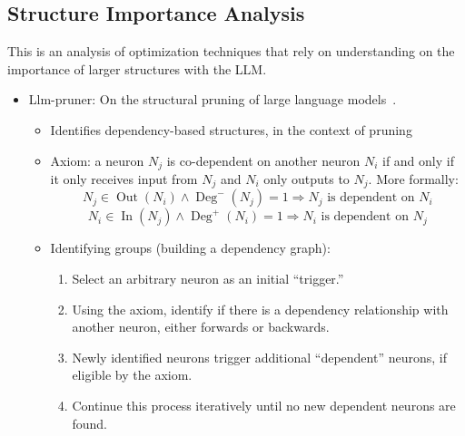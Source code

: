 
\subsection{Structure Importance Analysis}\label{subsec:strucure-importance-analysis}

This is an analysis of optimization techniques that rely on understanding on the importance of larger structures with the LLM\@.
\begin{itemize}
    \item Llm-pruner: On the structural pruning of large language models~\cite{ma2023llm}.
    \begin{itemize}
        \item Identifies dependency-based structures, in the context of pruning
        \item Axiom: a neuron $N_j$ is co-dependent on another neuron $N_i$ if and only if it only receives input from $N_j$ and $N_i$ only outputs to $N_j$.
         More formally:
        \begin{equation}
             N_j \in \operatorname{Out}(N_i) \wedge \operatorname{Deg}^-(N_j) = 1 \Rightarrow N_j \text{ is dependent on } N_i\label{eq:equation}
        \end{equation}
        \begin{equation}
             N_i \in \operatorname{In}(N_j) \wedge \operatorname{Deg}^+(N_i) = 1 \Rightarrow N_i \text{ is dependent on } N_j\label{eq:equation2}
        \end{equation}
        \item Identifying groups (building a dependency graph):
        \begin{enumerate}
            \item Select an arbitrary neuron as an initial ``trigger.''
            \item Using the axiom, identify if there is a dependency relationship with another neuron, either forwards or backwards.
            \item Newly identified neurons trigger additional ``dependent'' neurons, if eligible by the axiom.
            \item Continue this process iteratively until no new dependent neurons are found.
        \end{enumerate}

\end{itemize}
\end{itemize}
